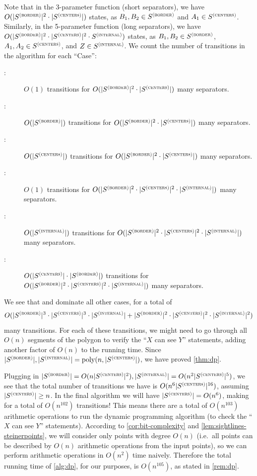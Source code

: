 \documentclass{theoretics}
\newcommand\Scen{S^{\textsc{(centers)}}}
\newcommand\Sint{S^{\textsc{(internal)}}}
\newcommand\Sbor{S^{\textsc{(border)}}}
\newcommand\poly{\mathrm{poly}}
\begin{document}
Note that in the 3-parameter function  (short separators), we have $O(|\Sbor|^2\cdot|\Scen|)$ states, as $B_1,B_2\in \Sbor$ and $A_1\in \Scen$.
Similarly, in the 5-parameter function  (long separators), we have $O(|\Sbor|^2\cdot|\Scen|^2\cdot \Sint)$ states, as $B_1,B_2\in \Sbor$, $A_1,A_2\in \Scen$, and $Z\in \Sint$.
We count the number of transitions in the algorithm for each ``Case'':
\begin{description}
\item[:] $O(1)$ transitions for $O(|\Sbor|^2\cdot |\Scen|)$ many separators.
\item[:] $O(|\Sbor|)$ transitions for $O(|\Sbor|^2\cdot |\Scen|)$ many separators.
\item[:] $O(|\Scen|)$ transitions for $O(|\Sbor|^2\cdot |\Scen|)$ many separators.
\item[:] $O(1)$ transitions for $O(|\Sbor|^2\cdot |\Scen|^2\cdot |\Sint|)$ many separators.
\item[:] $O(|\Sint|)$ transitions for $O(|\Sbor|^2\cdot |\Scen|^2\cdot |\Sint|)$ many separators.
\item[:] $O(|\Scen|\cdot |\Sbor|)$ transitions for $O(|\Sbor|^2\cdot |\Scen|^2\cdot |\Sint|)$ many separators.
\end{description}
We see that  and  dominate all other cases, for a total of
\begin{equation*}
O(|\Sbor|^3\cdot|\Scen|^3\cdot|\Sint| +
|\Sbor|^2\cdot|\Scen|^2\cdot|\Sint|^2)
\end{equation*}
many transitions.
For each of these transitions, we might need to go through all $O(n)$ segments of the polygon to verify the ``$X$ can see $Y$'' statements, adding another factor of $O(n)$ to the running time. Since $|\Sbor|, |\Sint| = \poly(n,|\Scen|)$, we have proved \cref{thm:dp}.
\begin{remark}
Plugging in $|\Sbor| = O(n|\Scen|^2), |\Sint| = O(n^2|\Scen|^5)$, we see that the total number of transitions we have is
$O(n^6|\Scen|^{16})$, assuming $|\Scen| \ge n$. In the final algorithm we will have $|\Scen| = O(n^6)$, making for a total of $O(n^{102})$ transitions!
This means there are a total of $O(n^{103})$  arithmetic operations to run the dynamic programming algorithm (to check the ``$X$ can see $Y$'' statements). 
According to \cref{cor:bit-complexity} and \cref{lem:sightlines-steinerpoints}, we will consider only points with degree $O(n)$ (i.e.\ all points can be described by $O(n)$ arithmetic operations from the input points), so we can perform arithmetic operations in $O(n^2)$ time naively. 
Therefore the total running time of \cref{alg:dp}, for our purposes, is $O(n^{105})$, as stated in \cref{rem:dp}.
\end{remark}
\end{document}

